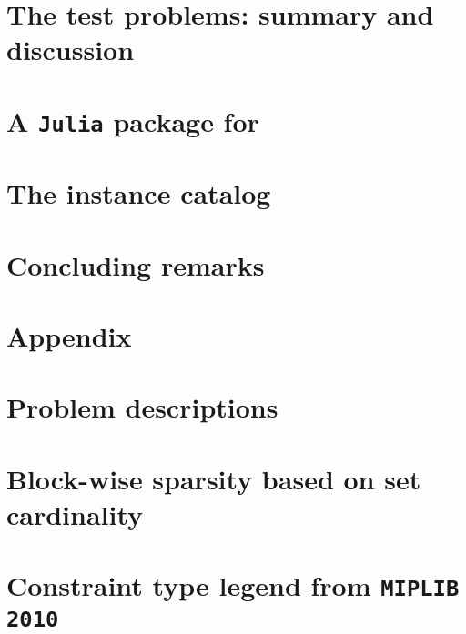 \section{The test problems: summary and discussion}\label{sec:summary}


\section{A \texttt{Julia} package for \siplibtwo} \label{sec:package}


\section{The instance catalog}\label{sec:instance_catalog}


\section{Concluding remarks}\label{sec:conclusion}



\appendix

\section*{Appendix}

\section{Problem descriptions} \label{sec:prob_desc}


\section{Block-wise sparsity based on set cardinality} \label{sec:sparsity}


\section{Constraint type legend from \texttt{MIPLIB 2010}} \label{sec:miplibconstraint}


